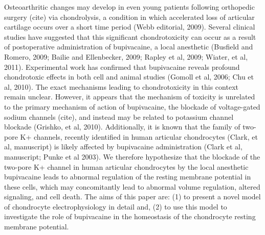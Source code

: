 Osteoarthritic changes may develop in even young patients following
orthopedic surgery (cite) via chondrolysis, a condition in which
accelerated loss of articular cartilage occurs over a short time
period (Webb editorial, 2009).  Several clinical studies have
suggested that this significant chondrotoxicity can occur as a result
of postoperative administration of bupivacaine, a local anesthetic
(Busfield and Romero, 2009; Bailie and Ellenbecker, 2009; Rapley et
al, 2009; Wiater, et al, 2011).  Experimental work has confirmed that
bupivacaine reveals profound chondrotoxic effects in both cell
\citep{Chuetal2006} and animal studies (Gomoll et al, 2006; Chu et al,
2010).  The exact mechanisms leading to chondrotoxicity in this
context remain unclear.  However, it appears that the mechanism of
toxicity is unrelated to the primary mechanism of action of
bupivacaine, the blockade of voltage-gated sodium channels (cite), and
instead may be related to potassium channel blockade (Grishko, et al,
2010).  Additionally, it is known that the family of two-pore K+
channels, recently identified in human articular chondrocytes (Clark,
et al, manuscript) is likely affected by bupivacaine administration
(Clark et al, manuscript; Punke et al 2003).  We therefore hypothesize
that the blockade of the two-pore K+ channel in human articular
chondrocytes by the local anesthetic bupivacaine leads to abnormal
regulation of the resting membrane potential in these cells, which may
concomitantly lead to abnormal volume regulation, altered signaling,
and cell death.  The aims of this paper are: (1) to present a novel
model of chondrocyte electrophysiology in detail and, (2) to use this
model to investigate the role of bupivacaine in the homeostasis of the
chondrocyte resting membrane potential.



